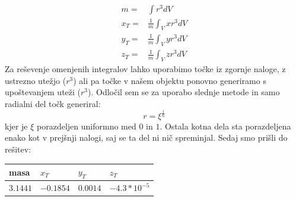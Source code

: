 \documentclass[slovene,11pt,a4paper]{article}
\numberwithin{equation}{section} %
\numberwithin{figure}{section} %
\numberwithin{table}{section} %
\begin{document}
\begin{equation}
\begin{aligned}
m=&\int r^3 dV \\
x_T=&\frac{1}{m}\int_V x r^3 dV \\
y_T =& \frac{1}{m}\int_V y r^3 dV \\
z_T =& \frac{1}{m}\int_V z r^3 dV
\end{aligned}
\end{equation}
Za reševenje omenjenih integralov lahko uporabimo točke iz zgornje naloge, z ustrezno utežjo ($r^3$) ali pa točke v našem objektu ponovno generiramo s upoštevanjem uteži ($r^3$).
Odločil sem se za uporabo slednje metode in samo radialni del točk generiral:
\begin{equation}
r=\xi^{\frac{1}{6}}
\end{equation}
kjer je $\xi$ porazdeljen uniformno med $0$ in $1$. Ostala kotna dela sta porazdeljena enako kot v prejšnji nalogi, saj se ta del ni nič spreminjal.
Sedaj smo prišli do rešitev:
\begin{table}[h]
\begin{center}
\begin{tabular}{|l|l|l|l|}
\hline
masa & $x_T$ & $y_T$ & $z_T$ \\ \hline
$3.1441$ & $-0.1854$ & $0.0014$ & $-4.3*10^{-5}$ \\ \hline
\end{tabular}
\end{center}
\end{table}

\pagebreak
\end{document}

